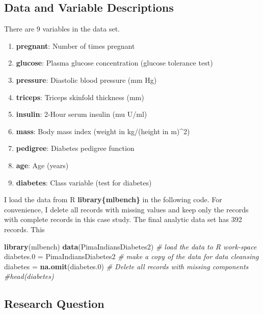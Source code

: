 \documentclass[
]{book}
\newenvironment{Shaded}{\begin{snugshade}}{\end{snugshade}}
\newcommand{\CommentTok}[1]{\textcolor[rgb]{0.56,0.35,0.01}{\textit{#1}}}
\newcommand{\FloatTok}[1]{\textcolor[rgb]{0.00,0.00,0.81}{#1}}
\newcommand{\FunctionTok}[1]{\textcolor[rgb]{0.13,0.29,0.53}{\textbf{#1}}}
\newcommand{\NormalTok}[1]{#1}
\newcommand{\OtherTok}[1]{\textcolor[rgb]{0.56,0.35,0.01}{#1}}
\begin{document}
\hypertarget{data-and-variable-descriptions-2}{%
\subsection{Data and Variable Descriptions}\label{data-and-variable-descriptions-2}}

There are 9 variables in the data set.

\begin{enumerate}
\def\labelenumi{\arabic{enumi}.}
\item
  \textbf{pregnant}: Number of times pregnant
\item
  \textbf{glucose}: Plasma glucose concentration (glucose tolerance test)
\item
  \textbf{pressure}: Diastolic blood pressure (mm Hg)
\item
  \textbf{triceps}: Triceps skinfold thickness (mm)
\item
  \textbf{insulin}: 2-Hour serum insulin (mu U/ml)
\item
  \textbf{mass}: Body mass index (weight in kg/(height in m)\^{}2)
\item
  \textbf{pedigree}: Diabetes pedigree function
\item
  \textbf{age}: Age (years)
\item
  \textbf{diabetes}: Class variable (test for diabetes)
\end{enumerate}

I load the data from R \textbf{library\{mlbench\}} in the following code. For convenience, I delete all records with missing values and keep only the records with complete records in this case study. The final analytic data set has 392 records. This

\begin{Shaded}
\begin{Highlighting}[]
\FunctionTok{library}\NormalTok{(mlbench)}
\FunctionTok{data}\NormalTok{(PimaIndiansDiabetes2)           }\CommentTok{\# load the data to R work{-}space}
\NormalTok{diabetes}\FloatTok{.0} \OtherTok{=}\NormalTok{ PimaIndiansDiabetes2    }\CommentTok{\# make a copy of the data for data cleansing }
\NormalTok{diabetes }\OtherTok{=} \FunctionTok{na.omit}\NormalTok{(diabetes}\FloatTok{.0}\NormalTok{)       }\CommentTok{\# Delete all records with missing components}
\CommentTok{\#head(diabetes)}
\end{Highlighting}
\end{Shaded}

\hypertarget{research-question-1}{%
\subsection{Research Question}\label{research-question-1}}
\end{document}
